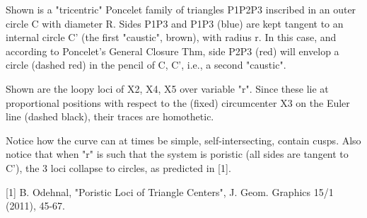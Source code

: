 Shown is a "tricentric" Poncelet family of triangles P1P2P3 inscribed in an outer circle C with diameter R. Sides P1P3 and P1P3 (blue) are kept tangent to an internal circle C' (the first "caustic", brown), with radius r. In this case, and according to Poncelet's General Closure Thm, side P2P3 (red) will envelop a circle (dashed red) in the pencil of C, C', i.e., a second "caustic".

Shown are the loopy loci of X2, X4, X5 over variable "r". Since these lie at proportional positions with respect to the (fixed) circumcenter X3 on the Euler line (dashed black), their traces are homothetic.

Notice how the curve can at times be simple, self-intersecting, contain cusps. Also notice that when "r" is such that the system is poristic (all sides are tangent to C'), the 3 loci collapse to circles, as predicted in [1].

[1] B. Odehnal, "Poristic Loci of Triangle Centers", J. Geom. Graphics 15/1 (2011), 45-67.